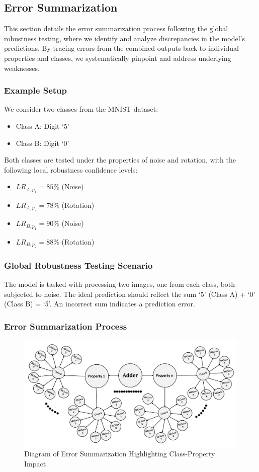 \documentclass[10pt, conference, a4paper, final]{IEEEtran}
\begin{document}
\subsection{Error Summarization}
This section details the error summarization process following the global robustness testing, where we identify and analyze discrepancies in the model's predictions. By tracing errors from the combined outputs back to individual properties and classes, we systematically pinpoint and address underlying weaknesses.

\subsubsection{Example Setup}
We consider two classes from the MNIST dataset:
\begin{itemize}
    \item Class A: Digit `5'
    \item Class B: Digit `0'
\end{itemize}
Both classes are tested under the properties of noise and rotation, with the following local robustness confidence levels:
\begin{itemize}
    \item \( LR_{A,p_1} = 85\% \) (Noise)
    \item \( LR_{A,p_2} = 78\% \) (Rotation)
    \item \( LR_{B,p_1} = 90\% \) (Noise)
    \item \( LR_{B,p_2} = 88\% \) (Rotation)
\end{itemize}

\subsubsection{Global Robustness Testing Scenario}
The model is tasked with processing two images, one from each class, both subjected to noise. The ideal prediction should reflect the sum `5' (Class A) + `0' (Class B) = `5'. An incorrect sum indicates a prediction error.

\subsubsection{Error Summarization Process}

\begin{figure}[H]
    \centering
    \includegraphics[width=\linewidth]{paper_images/step5.pdf}
    \caption{Diagram of Error Summarization Highlighting Class-Property Impact}
    \label{fig:error-summarization}
\end{figure}
\end{document}
